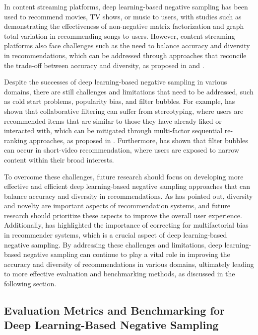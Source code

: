 \documentclass[11pt,a4paper]{article}
\begin{document}
In content streaming platforms, deep learning-based negative sampling has been used to recommend movies, TV shows, or music to users, with studies such as \cite{doi:10.1109/icassp.2016.7472115} demonstrating the effectiveness of non-negative matrix factorization and graph total variation in recommending songs to users. However, content streaming platforms also face challenges such as the need to balance accuracy and diversity in recommendations, which can be addressed through approaches that reconcile the trade-off between accuracy and diversity, as proposed in \cite{doi:10.1145/3589334.3645625} and \cite{doi:10.1145/3589334.3645497}.

Despite the successes of deep learning-based negative sampling in various domains, there are still challenges and limitations that need to be addressed, such as cold start problems, popularity bias, and filter bubbles. For example, \cite{doi:10.1145/3465416.3483298} has shown that collaborative filtering can suffer from stereotyping, where users are recommended items that are similar to those they have already liked or interacted with, which can be mitigated through multi-factor sequential re-ranking approaches, as proposed in \cite{doi:10.1145/3580305.3599869}. Furthermore, \cite{doi:10.1145/3589334.3648159} has shown that filter bubbles can occur in short-video recommendation, where users are exposed to narrow content within their broad interests.

To overcome these challenges, future research should focus on developing more effective and efficient deep learning-based negative sampling approaches that can balance accuracy and diversity in recommendations. As \cite{doi:10.1587/transinf.2017edr0003} has pointed out, diversity and novelty are important aspects of recommendation systems, and future research should prioritize these aspects to improve the overall user experience. Additionally, \cite{doi:10.1145/3626772.3657749} has highlighted the importance of correcting for multifactorial bias in recommender systems, which is a crucial aspect of deep learning-based negative sampling. By addressing these challenges and limitations, deep learning-based negative sampling can continue to play a vital role in improving the accuracy and diversity of recommendations in various domains, ultimately leading to more effective evaluation and benchmarking methods, as discussed in the following section.


\subsection{Evaluation Metrics and Benchmarking for Deep Learning-Based Negative Sampling}
\end{document}
